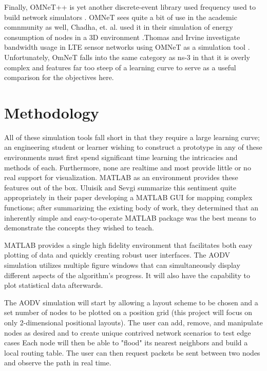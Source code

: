 \documentclass[conference]{IEEEtran}
\begin{document}
Finally, OMNeT++ is yet another discrete-event library used frequency used to build network simulators \cite{omnet}. OMNeT sees quite a bit of use in the academic comnmunity as well, Chadha, et. al. used it in their simulation of energy consumption of nodes in a 3D environment \cite{omnet_efficient}.Thomas and Irvine investigate bandwidth usage in LTE sensor networks using OMNeT as a simulation tool \cite{omnet_lte}. Unfortunately, OmNeT falls into the same category as ns-3 in that it is overly complex and features far too steep of a learning curve to serve as a useful comparison for the objectives here.

\section{Methodology}

All of these simulation tools fall short in that they require a large learning curve; an engineering student or learner wishing to construct a prototype in any of these environments must first spend significant time learning the intricacies and methods of each. Furthermore, none are realtime and most provide little or no real support for visualization. MATLAB as an environment provides these features out of the box. Uluisik and Sevgi summarize this sentiment quite appropriately in their paper developing a MATLAB GUI for mapping complex functions\cite{matlab_gui}; after summarizing the existing body of work, they determined that an inherently simple and easy-to-operate MATLAB package was the best means to demonstrate the concepts they wished to teach. 

MATLAB provides a single high fidelity environment that facilitates both easy plotting of data and quickly creating robust user interfaces. The AODV simulation utilizes multiple figure windows that can simultaneously display different aspects of the algorithm's progress. It will also have the capability to plot statistical data afterwards.

The AODV simulation will start by allowing a layout scheme to be chosen and a set number of nodes to be plotted on a position grid (this project will focus on only 2-dimensional positional layouts). The user can add, remove, and manipulate nodes as desired and to create unique contrived network scenarios to test edge cases Each node will then be able to "flood" its nearest neighbors and build a local routing table. The user can then request packets be sent between two nodes and observe the path in real time.
\end{document}
